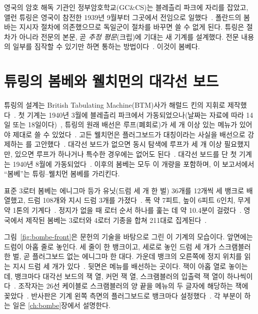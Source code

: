 영국의 암호 해독 기관인 정부암호학교(GC\&CS)는 블레츨리 파크에 자리를 잡았고, 앨런 튜링은 영국이
참전한 1939년 9월부터 그곳에서 전임으로 일했다~\cite{hodges-biography,jackson-bh06}. 폴란드의 봄바는 지시자
절차에 의존했으므로 독일군이 절차를 바꾸면 쓸 수 없게 된다. 튜링은 절차가 아니라 전문의 본문, 곧
\emph{추정 평문}(크립)에 기대는 새 기계를 설계했다. 전문 내용의 일부를 짐작할 수 있기만 하면 통하는
방법이다~\cite{jackson-bh06,ellsbury1998bombe,hodges-biography}. 이것이 봄베다.

\section{튜링의 봄베와 웰치먼의 대각선 보드}

튜링의 설계는 British Tabulating Machine(BTM)사가 해럴드 킨의 지휘로
제작했다~\cite{carter2010bombe}. 첫 기계는 1940년 3월에 블레츨리 파크에서 가동되었으나(날짜는 자료에 따라
14일 또는 18일이다)~\cite{jackson-bh01,cryptomuseum-bombe}, 튜링의 원래 배선은 루프(폐회로)가 세 개 이상
있는 메뉴가 있어야 제대로 쓸 수 있었다~\cite{carter2010bombe,jackson-bh06}. 고든 웰치먼은 플러그보드가
대칭이라는 사실을 배선으로 강제하는 를
고안했다~\cite{welchman1986bomba,carter2010bombe}. 대각선 보드가 없으면 동시 탐색에 루프가 세 개 이상
필요했지만, 있으면 루프가 하나거나 특수한 경우에는 없어도 된다~\cite{carter2010bombe}. 대각선 보드를 단 첫
기계는 1940년 8월에 가동되었다~\cite{jackson-bh01,cryptomuseum-bombe}. 이후의 봄베는 모두 이 개량을
포함하며, 이 보고서에서 ``봄베''는 튜링--웰치먼 봄베를 가리킨다.

표준 3로터 봄베는 에니그마 등가 유닛(드럼 세 개 한 벌) 36개를 12개씩 세 뱅크로 배열했고, 드럼 108개와
지시 드럼 3개를 가졌다~\cite[5]{us6812report1944}. 폭 약 7피트, 높이 6피트 6인치, 무게 약 1톤의
기계다~\cite{ellsbury1998bombe,us6812report1944}. 정지가 없을 때 로터 순서 하나를 훑는 데 약 10.4분이
걸렸다~\cite{jackson-bh09,jackson-bh11}. 영국에서 제작된 봄베는 3로터와 4로터 기종을 합쳐
211대로 집계된다~\cite{jackson-bh14}.

그림~\ref{fig:bombe-front}은 문헌의 기술을 바탕으로 그린 이 기계의 모습이다. 앞면에는 드럼이 아홉 줄로
놓인다. 세 줄이 한 뱅크이고, 세로로 놓인 드럼 세 개가 스크램블러 한 벌, 곧 플러그보드 없는 에니그마 한
대다. 가운데 뱅크의 오른쪽에 정지 위치를 읽는 지시 드럼 세 개가 있다~\cite[5]{us6812report1944}.
뒷면은 메뉴를 배선하는 곳이다. 잭이 아홉 열로 놓이는데, 뱅크마다 대각선 보드의 잭 열, 커먼 잭 열,
스크램블러의 입출력 잭 열이 하나씩이다~\cite[59, 68]{us6812report1944}\cite{jackson-bh10}. 조작자는 26선
케이블로 스크램블러의 양 끝을 메뉴의 두 글자에 해당하는 잭에 꽂았다~\cite[8--10]{us6812report1944}.
반사판은 기계 왼쪽 측면의 플러그보드로 뱅크마다 설정했다~\cite[5, 39]{us6812report1944}.
각 부분이 하는 일은 \ref{ch:bombe}장에서 설명한다.

